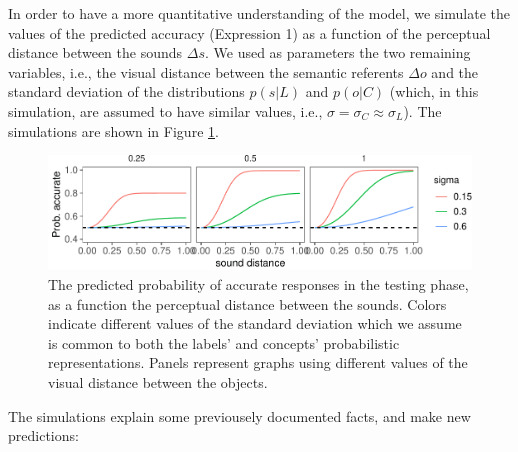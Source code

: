 \documentclass[10pt, letterpaper]{article}
\newenvironment{CodeChunk}{}{}
\begin{document}
In order to have a more quantitative understanding of the model, we
simulate the values of the predicted accuracy (Expression 1) as a
function of the perceptual distance between the sounds \(\Delta s\). We
used as parameters the two remaining variables, i.e., the visual
distance between the semantic referents \(\Delta o\) and the standard
deviation of the distributions \(p(s| L)\) and \(p(o | C)\) (which, in
this simulation, are assumed to have similar values, i.e.,
\(\sigma =\sigma_C \approx \sigma_L\)). The simulations are shown in
Figure \ref{fig:simulation}.

\begin{CodeChunk}
\begin{figure}[h]

{\centering \includegraphics{figs/simulation-1} 

}

\caption{\label{fig:simulation}The predicted probability of accurate responses in the testing phase, as a function the perceptual distance between the sounds. Colors indicate different values of the standard deviation which we assume is common to both the labels' and concepts' probabilistic representations. Panels represent graphs using different values of the visual distance between the objects.}\label{fig:simulation}
\end{figure}
\end{CodeChunk}

The simulations explain some previousely documented facts, and make new
predictions:
\end{document}
